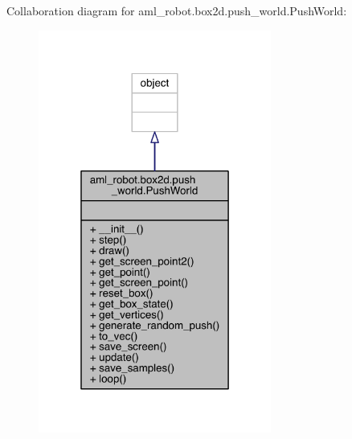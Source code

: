 Collaboration diagram for aml\+\_\+robot.\+box2d.\+push\+\_\+world.\+Push\+World\+:\nopagebreak
\begin{figure}[H]
\begin{center}
\leavevmode
\includegraphics[width=217pt]{classaml__robot_1_1box2d_1_1push__world_1_1_push_world__coll__graph}
\end{center}
\end{figure}
